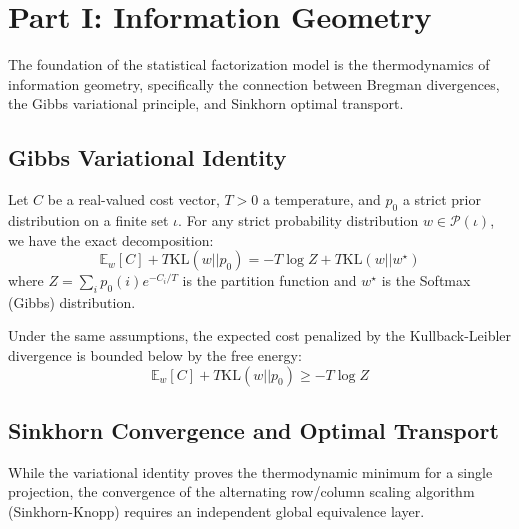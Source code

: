 \section{Part I: Information Geometry}
\label{sec:part1}

The foundation of the statistical factorization model is the thermodynamics of information geometry, specifically the connection between Bregman divergences, the Gibbs variational principle, and Sinkhorn optimal transport.

\subsection{Gibbs Variational Identity}

\begin{ktheorem}
Let $C$ be a real-valued cost vector, $T > 0$ a temperature, and $p_0$ a strict prior distribution on a finite set $\iota$. For any strict probability distribution $w \in \mathcal{P}(\iota)$, we have the exact decomposition:
\begin{equation}
\mathbb{E}_w[C] + T \mathrm{KL}(w || p_0) = -T \log Z + T \mathrm{KL}(w || w^\star)
\end{equation}
where $Z = \sum_i p_0(i) e^{-C_i/T}$ is the partition function and $w^\star$ is the Softmax (Gibbs) distribution.
\end{ktheorem}

\begin{ktheorem}
Under the same assumptions, the expected cost penalized by the Kullback-Leibler divergence is bounded below by the free energy:
\begin{equation}
\mathbb{E}_w[C] + T \mathrm{KL}(w || p_0) \ge -T \log Z
\end{equation}
\end{ktheorem}

\subsection{Sinkhorn Convergence and Optimal Transport}

While the variational identity proves the thermodynamic minimum for a single projection, the convergence of the alternating row/column scaling algorithm (Sinkhorn-Knopp) requires an independent global equivalence layer.

\begin{mtheorem}
\end{mtheorem}
